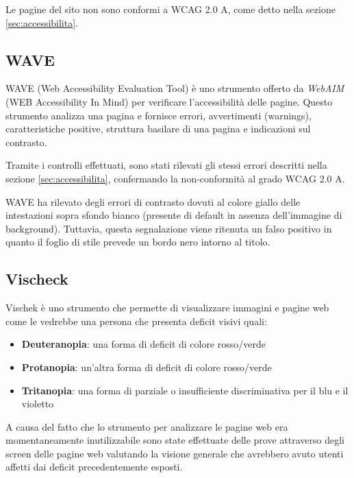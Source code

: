 Le pagine del sito non sono conformi a WCAG 2.0 A, come detto nella sezione
\ref{sec:accessibilita}.

\subsection{WAVE} %
WAVE (Web Accessibility Evaluation Tool) è uno strumento offerto da
\textit{WebAIM} (WEB Accessibility In Mind) per verificare l'accessibilità
delle pagine. Questo strumento analizza una pagina e fornisce errori,
avvertimenti (warnings), caratteristiche positive, struttura basilare di una
pagina e indicazioni sul contrasto.

Tramite i controlli effettuati, sono stati rilevati gli stessi errori
descritti nella sezione \ref{sec:accessibilita}, confermando la non-conformità
al grado WCAG 2.0 A.

WAVE ha rilevato degli errori di contrasto dovuti al colore giallo delle
intestazioni sopra sfondo bianco (presente di default in assenza dell'immagine
di background). Tuttavia, questa segnalazione viene ritenuta un falso positivo
in quanto il foglio di stile prevede un bordo nero intorno al titolo.

\subsection{Vischeck}
Vischek è uno strumento che permette di visualizzare immagini e pagine web
come le vedrebbe una persona che presenta deficit visivi quali:
\begin{itemize}
\item \textbf{Deuteranopia}: una forma di deficit di colore rosso/verde
\item \textbf{Protanopia}: un'altra forma di deficit di colore rosso/verde
\item \textbf{Tritanopia}: una forma di parziale o insufficiente
discriminativa per il blu e il violetto
\end{itemize}
A causa del fatto che lo strumento per analizzare le pagine web era momentaneamente inutilizzabile sono state effettuate delle prove attraverso degli screen delle pagine web
valutando la visione generale che avrebbero avuto utenti affetti dai deficit precedentemente
esposti.

